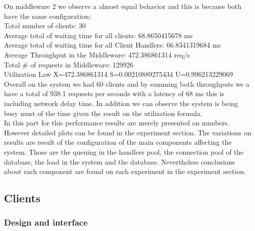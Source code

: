  On middleware 2 we observe a almost equal behavior and this is because both have the same configuration:\\
Total number of clients:	30\\
Average total of waiting time for all clients:	68.8650415678 ms\\
Average total of waiting time for all Client Handlers:	66.8341319684 ms\\
Average Throughput in the Middleware:	472.386861314 req/s\\
Total \# of requests in Middleware:	129926\\
Utilization Law 	X=472.386861314	S=0.00210889275434	U=0.996213229069 \\

Overall on the system we had 60 clients and by summing both throughputs we a have a total of 938.1 requests per seconds with a latency of 68 ms this is including network delay time. In addition we can observe the system is being busy must of the time given the result on the utilization formula.\\

In this part for this performance results are merely presented on numbers. However detailed plots can be found in the experiment section.
The variations on results are result of the configuration of the main components affecting the system. Those are the queuing in the handlers pool, the connection pool of the database, the load in the system and the database. Nevertheless conclusions about each component are found on each experiment in the experiment section.


\subsection{Clients}\label{sec:clients}


\subsubsection{Design and interface}\label{sec:design-and-interface}

